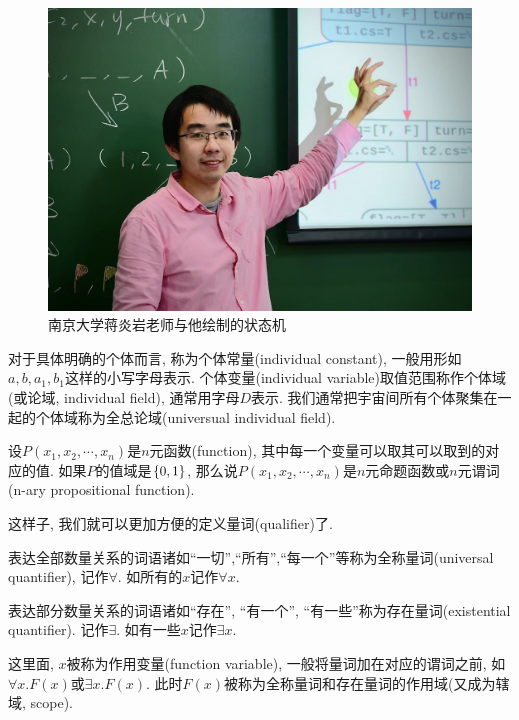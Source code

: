 \begin{figure}
		\begin{center}
			\includegraphics[scale=0.2]{2-prop-logic/figs/jyy.jpeg}
		\end{center}
		\label{fig:jyy}
		\caption{南京大学蒋炎岩老师与他绘制的状态机}
	\end{figure}

\begin{definition}
	对于具体明确的个体而言, 称为个体常量(individual constant), 一般用形如$a,b,a_1,b_1$这样的小写字母表示. 个体变量(individual variable)取值范围称作个体域(或论域, individual field), 通常用字母$D$表示. 我们通常把宇宙间所有个体聚集在一起的个体域称为全总论域(universual individual field). 
\end{definition}  

\begin{definition}[$n$元命题函数]
	设$P(x_1,x_2,\cdots,x_n)$是$n$元函数(function), 其中每一个变量可以取其可以取到的对应的值. 如果$P$的值域是$\{0,1\}$, 那么说$P(x_1 ,x_2, \cdots, x_n)$是$n$元命题函数或$n$元谓词(n-ary propositional function).  
\end{definition}

这样子, 我们就可以更加方便的定义量词(qualifier)了. 

\begin{definition}[全称量词与特称量词]
	表达全部数量关系的词语诸如``一切'',``所有'',``每一个''等称为全称量词(universal quantifier), 记作$\forall$. 如所有的$x$记作$\forall x$. 
	
	表达部分数量关系的词语诸如``存在'', ``有一个'', ``有一些''称为存在量词(existential quantifier). 记作$\exists$. 如有一些$x$记作$\exists x$. 
	
	这里面, $x$被称为作用变量(function variable), 一般将量词加在对应的谓词之前, 如$\forall x. F(x)$或$\exists x. F(x)$. 此时$F(x)$被称为全称量词和存在量词的作用域(又成为辖域, scope). 
\end{definition}

